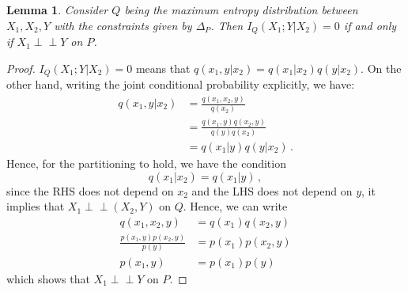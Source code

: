 \documentclass{article}
\newcommand{\ind}{\mathrel{\perp\!\!\!\perp}}
\newtheorem{lemma}{Lemma}
\begin{document}
\begin{lemma} \label{lemma:MES-zeroIc}
    Consider $Q$ being the maximum entropy distribution between $X_1,X_2,Y$ with the constraints given by $\Delta_P$. Then $I_Q(X_1;Y|X_2)=0$ if and only if $X_1\ind Y$ on $P$.
\end{lemma}
\begin{proof}
    $I_Q(X_1;Y|X_2)=0$ means that $q(x_1,y|x_2)=q(x_1|x_2)q(y|x_2)$. On the other hand, writing the joint conditional probability explicitly, we have:
\begin{equation}
\begin{aligned}
    q(x_1,y|x_2) & = \frac{q(x_1,x_2,y)}{q(x_2)} \\
    & = \frac{q(x_1,y)q(x_2,y)}{q(y)q(x_2)} \\
    & = q(x_1|y)q(y|x_2) \,.
\end{aligned}
\end{equation}
    Hence, for the partitioning to hold, we have the condition
    \begin{equation}
        q(x_1|x_2) = q(x_1|y) \,,
    \end{equation}
    since the RHS does not depend on $x_2$ and the LHS does not depend on $y$, it implies that $X_1\ind (X_2,Y)$ on $Q$. 
    Hence, we can write
    \begin{equation}
        \begin{aligned}
            q(x_1,x_2,y) & = q(x_1)q(x_2,y) \\
            \frac{p(x_1,y)p(x_2,y)}{p(y)} & = p(x_1)p(x_2,y) \\
            p(x_1,y) & = p(x_1)p(y)
        \end{aligned}
    \end{equation}
    which shows that $X_1\ind Y$ on $P$.
\end{proof}
\end{document}
